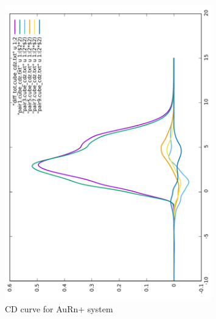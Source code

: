 \documentclass[journal=inoraj,manuscript=article]{achemso}
\begin{document}
\begin{figure}[!h]
\includegraphics[angle=-90,width=0.80\textwidth]{./AuRn+/cd.pdf}
\caption{CD curve for AuRn+ system}
\end{figure}
\end{document}
